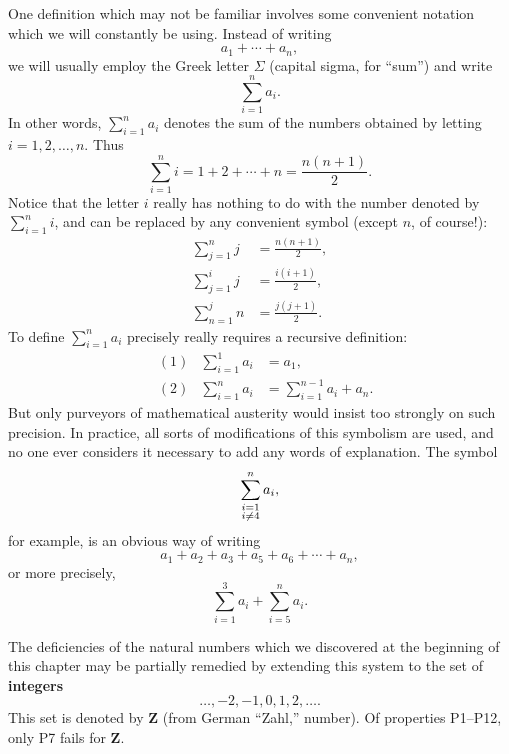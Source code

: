 One definition which may not be familiar involves some convenient notation
which we will constantly be using. Instead of writing
\[ a_1 + \cdots + a_n, \]
we will usually employ the Greek letter $\Sigma$ (capital sigma, for ``sum'')
and write
\[ \sum_{i=1}^{n} a_i. \]
In other words, $\sum_{i=1}^{n} a_i$ denotes the sum of the numbers obtained
by letting $i = 1, 2, \dots, n$. Thus
\[
\sum_{i=1}^{n} i = 1 + 2 + \cdots + n = \frac{n(n+1)}{2}.
\]
Notice that the letter $i$ really has nothing to do with the number denoted by
$\sum_{i=1}^{n} i$, and can be replaced by any convenient symbol (except $n$,
of course!):
\begin{align*}
\sum_{j=1}^{n} j &= \frac{n(n+1)}{2},\\
\sum_{j=1}^{i} j &= \frac{i(i+1)}{2},\\
\sum_{n=1}^{j} n &= \frac{j(j+1)}{2}.
\end{align*}
To define $\sum_{i=1}^{n} a_i$ precisely really requires a recursive
definition:
\begin{align*}
&(1) & \sum_{i=1}^{1} a_i &= a_1,\\
&(2) & \sum_{i=1}^{n} a_i &= \sum_{i=1}^{n-1} a_i + a_n.
\end{align*}
But only purveyors of mathematical austerity would insist too strongly on
such precision. In practice, all sorts of modifications of this symbolism are
used, and no one ever considers it necessary to add any words of explanation.
The symbol
\[ \smashoperator{\sum_{\substack{i=1\\ i \neq 4}}^{n}} a_i, \]
for example, is an obvious way of writing
\[ a_1 + a_2 + a_3 + a_5 + a_6 + \cdots + a_n, \]
or more precisely,
\[ \sum_{i=1}^{3} a_i + \sum_{i=5}^{n} a_i. \]

The deficiencies of the natural numbers which we discovered at the beginning
of this chapter may be partially remedied by extending this system to the set
of \textbf{integers}
\[ \dots, -2, -1, 0, 1, 2, \dots. \]
This set is denoted by $\mathbf{Z}$ (from German ``Zahl,'' number). Of
properties P1--P12, only P7 fails for $\mathbf{Z}$.

